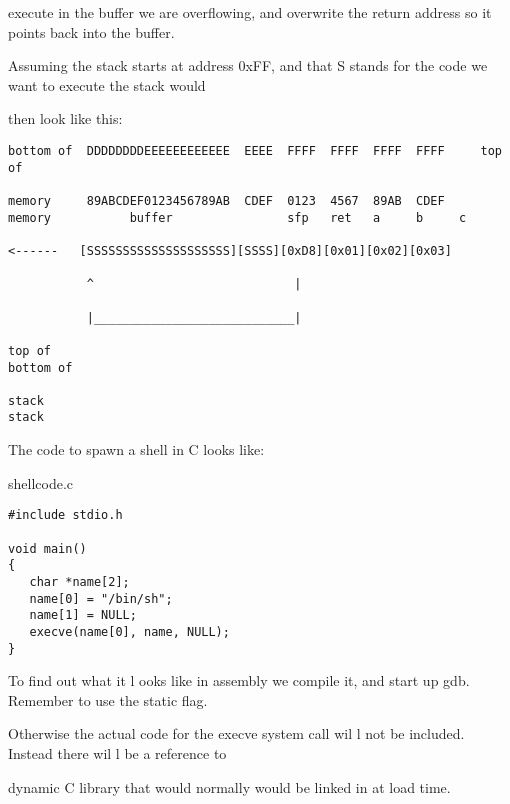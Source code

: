 \documentclass[10pt]{article}
\begin{document}
execute in the buffer we are overflowing, and overwrite the return address so it points back into the buffer. 

Assuming the stack starts at address 0xFF, and that S stands for the code we want to execute the stack would 

then look like this:

\begin{lstlisting}
bottom of  DDDDDDDDEEEEEEEEEEEE  EEEE  FFFF  FFFF  FFFF  FFFF     top of

memory     89ABCDEF0123456789AB  CDEF  0123  4567  89AB  CDEF     memory           buffer                sfp   ret   a     b     c

<------   [SSSSSSSSSSSSSSSSSSSS][SSSS][0xD8][0x01][0x02][0x03]

           ^                            |

           |____________________________|

top of                                                            bottom of

stack                                                                 stack
\end{lstlisting}

  

The code to spawn a shell in C looks like:

shellcode.c

\begin{lstlisting}
#include stdio.h

void main() 
{
   char *name[2];
   name[0] = "/bin/sh";
   name[1] = NULL;
   execve(name[0], name, NULL);
}
\end{lstlisting}

To find out what it l ooks like in assembly we compile it, and start up gdb. Remember to use the  static flag. 

Otherwise the actual code  for the execve system call wil l not be included. Instead there wil l be a reference to 

dynamic C library that would normally would be linked in at load time. 
\end{document}
